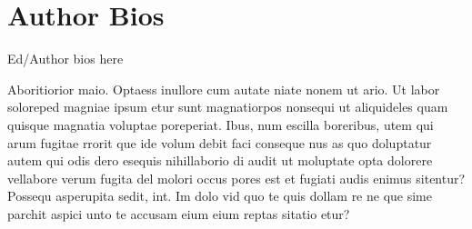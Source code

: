 \chapter*{Author Bios}

Ed/Author bios here


Aboritiorior maio. Optaess inullore cum autate niate nonem ut ario. Ut labor soloreped magniae ipsum etur sunt magnatiorpos nonsequi ut aliquideles quam quisque magnatia voluptae poreperiat.
Ibus, num escilla boreribus, utem qui arum fugitae rrorit que ide volum debit faci conseque nus as quo doluptatur autem qui odis dero esequis nihillaborio di audit ut moluptate opta dolorere vellabore verum fugita del molori occus pores est et fugiati audis enimus sitentur?
Possequ asperupita sedit, int.
Im dolo vid quo te quis dollam re ne que sime parchit aspici unto te accusam eium eium reptas sitatio etur?


